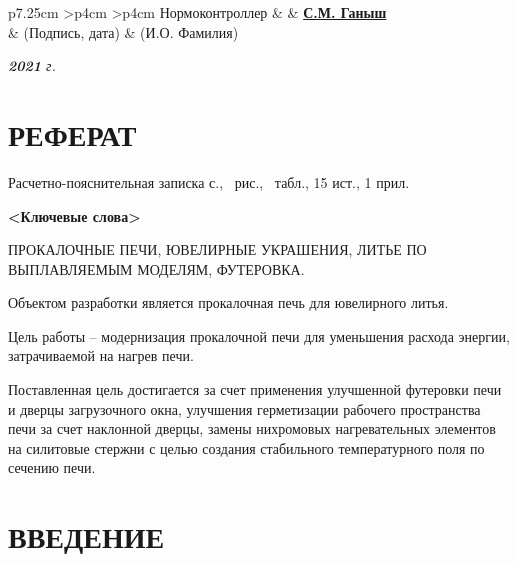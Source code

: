\documentclass[utf8x, 14pt, oneside, a4paper]{article}
\newenvironment{signstabular}[1][1]{
	\renewcommand*{\arraystretch}{#1}
	\tabular
}{
	\endtabular
}
\begin{document}
\begin{titlepage}
\begin{table}[h!]
			\vspace{\baselineskip}

			\begin{signstabular}[0.7]{p{7.25cm} >{\centering\arraybackslash}p{4cm} >{\centering\arraybackslash}p{4cm}}
				Нормоконтроллер & \uline{\hspace*{4cm}} & \uline{\hfill \textbf{С.М. Ганыш} \hfill} \\
				& \scriptsize (Подпись, дата) & \scriptsize (И.О. Фамилия)
			\end{signstabular}
		\end{table}

		\vfill

		\begin{center}
			\normalsize \textit{\textbf{2021} г.}
		\end{center}
	\end{titlepage}
\pagebreak
	\normalsize
	\setcounter{page}{2}
	
		\section*{РЕФЕРАТ}
		\normalsize
			Расчетно-пояснительная записка \pageref{LastPage} с., \totalfigures\ рис., \totaltables\ табл., 15 ист., 1 прил.

			\textbf{<Ключевые слова>}
			
ПРОКАЛОЧНЫЕ ПЕЧИ, ЮВЕЛИРНЫЕ УКРАШЕНИЯ, ЛИТЬЕ ПО ВЫПЛАВЛЯЕМЫМ МОДЕЛЯМ, ФУТЕРОВКА.

Объектом разработки является прокалочная печь для ювелирного литья.

Цель работы -- модернизация прокалочной печи для уменьшения расхода энергии, затрачиваемой на нагрев печи.

Поставленная цель достигается за счет применения улучшенной футеровки печи и дверцы загрузочного окна, улучшения герметизации рабочего пространства печи за счет наклонной дверцы, замены нихромовых нагревательных элементов на силитовые стержни с целью создания стабильного температурного поля по сечению печи.


		\pagebreak
	
	\renewcommand{\contentsname}{\normalsize\bfseries\centering СОДЕРЖАНИЕ}
	\small
	\tableofcontents
	\normalsize

		\pagebreak

	\section*{ВВЕДЕНИЕ}
\end{document}
